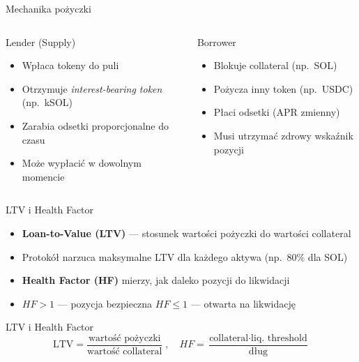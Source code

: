 \begin{frame}{Mechanika pożyczki}
  \begin{columns}
      \begin{block}{Lender (Supply)}
        \begin{itemize}
          \item Wpłaca tokeny do puli
          \item Otrzymuje \emph{interest-bearing token} (np.\ kSOL)
          \item Zarabia odsetki proporcjonalne do czasu
          \item Może wypłacić w dowolnym momencie
        \end{itemize}
      \end{block}

      \begin{block}{Borrower}
        \begin{itemize}
          \item Blokuje collateral (np.\ SOL)
          \item Pożycza inny token (np.\ USDC)
          \item Płaci odsetki (APR zmienny)
          \item Musi utrzymać zdrowy wskaźnik pozycji
        \end{itemize}
      \end{block}
  \end{columns}
\end{frame}

\begin{frame}{LTV i Health Factor}
  \begin{itemize}
    \item \textbf{Loan-to-Value (LTV)} --- stosunek wartości pożyczki do wartości collateral
    \item Protokół narzuca maksymalne LTV dla każdego aktywa (np.\ 80\% dla SOL)
    \item \textbf{Health Factor (HF)} mierzy, jak daleko pozycji do likwidacji
    \item $HF > 1$ --- pozycja bezpieczna \quad $HF \leq 1$ --- otwarta na likwidację
  \end{itemize}
  \vspace{0.3cm}
  \begin{block}{LTV i Health Factor}
    \[
      \text{LTV} = \frac{\text{wartość pożyczki}}{\text{wartość collateral}}
      \;,\quad
      HF = \frac{\text{collateral} \cdot \text{liq.\ threshold}}{\text{dług}}
    \]
  \end{block}
\end{frame}

